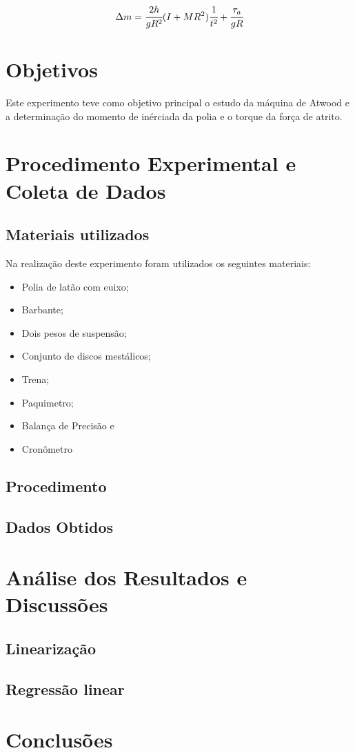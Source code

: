 \documentclass[10pt,english]{article}
\begin{document}
\[
\Delta m=\cfrac{2h}{gR^{2}}(I+MR^{2})\ensuremath{\cfrac{1}{t^{2}}}+\cfrac{\tau_{a}}{gR}
\]



\section{Objetivos}

Este experimento teve como objetivo principal o estudo da máquina
de Atwood e a determinação do momento de inérciada da polia e o torque
da força de atrito.


\section{Procedimento Experimental e Coleta de Dados}


\subsection{Materiais utilizados}

Na realização deste experimento foram utilizados os seguintes materiais: 
\begin{itemize}
\item Polia de latão com euixo; 
\item Barbante; 
\item Dois pesos de suspensão; 
\item Conjunto de discos mestálicos; 
\item Trena; 
\item Paquimetro; 
\item Balança de Precisão e 
\item Cronômetro 
\end{itemize}

\subsection{Procedimento}


\subsection{Dados Obtidos}


\section{Análise dos Resultados e Discussões}


\subsection{Linearização}


\subsection{Regressão linear}


\section{Conclusões}
\end{document}
